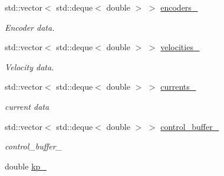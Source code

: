 \begin{DoxyCompactItemize}
\mbox{\label{classblmc__drivers_1_1SinePositionControl_a8d9d600b107301dfec87f04615e3721a}} 
std\+::vector$<$ std\+::deque$<$ double $>$ $>$ \hyperlink{classblmc__drivers_1_1SinePositionControl_a8d9d600b107301dfec87f04615e3721a}{encoders\+\_\+}
\begin{DoxyCompactList}\small\item\em Encoder data. \end{DoxyCompactList}\item 
\mbox{\label{classblmc__drivers_1_1SinePositionControl_a1ad95cec3a68d2dff06219dff5f83ab8}} 
std\+::vector$<$ std\+::deque$<$ double $>$ $>$ \hyperlink{classblmc__drivers_1_1SinePositionControl_a1ad95cec3a68d2dff06219dff5f83ab8}{velocities\+\_\+}
\begin{DoxyCompactList}\small\item\em Velocity data. \end{DoxyCompactList}\item 
\mbox{\label{classblmc__drivers_1_1SinePositionControl_ab7903dd177f6dcaa7efa00591ad656d9}} 
std\+::vector$<$ std\+::deque$<$ double $>$ $>$ \hyperlink{classblmc__drivers_1_1SinePositionControl_ab7903dd177f6dcaa7efa00591ad656d9}{currents\+\_\+}
\begin{DoxyCompactList}\small\item\em current data \end{DoxyCompactList}\item 
\mbox{\label{classblmc__drivers_1_1SinePositionControl_a29bd0da456de8a71467de12a3ab42265}} 
std\+::vector$<$ std\+::deque$<$ double $>$ $>$ \hyperlink{classblmc__drivers_1_1SinePositionControl_a29bd0da456de8a71467de12a3ab42265}{control\+\_\+buffer\+\_\+}
\begin{DoxyCompactList}\small\item\em control\+\_\+buffer\+\_\+ \end{DoxyCompactList}\item 
\mbox{\label{classblmc__drivers_1_1SinePositionControl_a1b9b44bf55c548c937b4a8ff06d0102d}} 
double \hyperlink{classblmc__drivers_1_1SinePositionControl_a1b9b44bf55c548c937b4a8ff06d0102d}{kp\+\_\+}

\end{DoxyCompactItemize}
